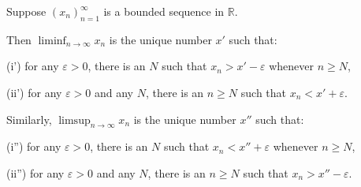 Suppose $(x_n)_{n=1}^{\infty}$ is a bounded sequence in $\mathbb{R}$.

Then $\liminf_{n \to \infty} x_n$ is the unique number $x'$ such that:

(i') for any $\varepsilon > 0$, there is an $N$ such that $x_n > x' - \varepsilon$ whenever $n \geq N$,

(ii') for any $\varepsilon > 0$ and any $N$, there is an $n \geq N$ such that $x_n < x' + \varepsilon$.

Similarly, $\limsup_{n \to \infty} x_n$ is the unique number $x''$ such that:

(i'') for any $\varepsilon > 0$, there is an $N$ such that $x_n < x'' + \varepsilon$ whenever $n \geq N$,

(ii'') for any $\varepsilon > 0$ and any $N$, there is an $n \geq N$ such that $x_n > x'' - \varepsilon$.
